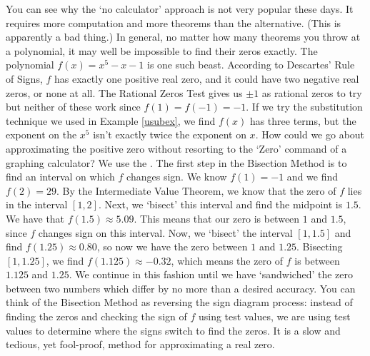 You can see why the `no calculator' approach is not very popular these days.  It requires more computation and more theorems than the alternative. (This is apparently a bad thing.)  In general, no matter how many theorems you throw at a polynomial, it may well be impossible to find their zeros exactly.  The polynomial $f(x) = x^5-x-1$ is one such beast.  According to Descartes' Rule of Signs, $f$ has exactly one positive real zero, and it could have two negative real zeros, or none at all.  The Rational Zeros Test gives us $\pm 1$ as rational zeros to try but neither of these work since $f(1) = f(-1) = -1$.  If we try the substitution technique we used in Example \ref{usubex}, we find $f(x)$ has three terms, but the exponent on the $x^5$ isn't exactly twice the exponent on $x$.  How could we go about approximating the positive zero without resorting to the `Zero' command of a graphing calculator?  We use the  .  The first step in the Bisection Method is to find an interval on which $f$ changes sign.  We know $f(1) = -1$ and we find $f(2) = 29$.  By the Intermediate Value Theorem, we know that the zero of $f$ lies in the interval $[1,2]$.  Next, we `bisect' this interval and find the midpoint is $1.5$.  We have that $f(1.5)\approx 5.09$.  This means that our zero is between $1$ and $1.5$, since $f$ changes sign on this interval.  Now, we `bisect' the interval $[1,1.5]$ and find $f(1.25) \approx 0.80$, so now we have the zero between $1$ and $1.25$.  Bisecting $[1,1.25]$, we find $f(1.125) \approx -0.32$, which means the zero of $f$ is between $1.125$ and $1.25$.  We continue in this fashion until we have `sandwiched' the zero between two numbers which differ by no more than a desired accuracy. You can think of the Bisection Method as reversing the sign diagram process:  instead of finding the zeros and checking the sign of $f$ using test values, we are using test values to determine where the signs switch to find the zeros.  It is a slow and tedious, yet fool-proof, method for approximating a real zero.  

{}

